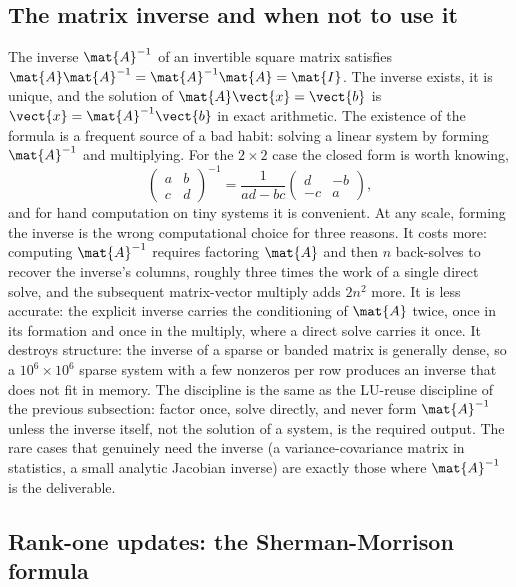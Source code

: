 

\subsection{The matrix inverse and when not to use it}

The inverse $\mat{A}^{-1}$ of an invertible square matrix satisfies
$\mat{A}\mat{A}^{-1} = \mat{A}^{-1}\mat{A} = \mat{I}$. The inverse
exists, it is unique, and the solution of $\mat{A}\vect{x} =
\vect{b}$ is $\vect{x} = \mat{A}^{-1}\vect{b}$ in exact arithmetic.
The existence of the formula is a frequent source of a bad habit:
solving a linear system by forming $\mat{A}^{-1}$ and multiplying.
For the $2 \times 2$ case the closed form is worth knowing,
\[
\begin{pmatrix} a & b \\ c & d \end{pmatrix}^{-1} = \frac{1}{ad - bc}
\begin{pmatrix} d & -b \\ -c & a \end{pmatrix},
\]
and for hand computation on tiny systems it is convenient. At any
scale, forming the inverse is the wrong computational choice for
three reasons. It costs more: computing $\mat{A}^{-1}$ requires
factoring $\mat{A}$ and then $n$ back-solves to recover the inverse's
columns, roughly three times the work of a single direct solve, and
the subsequent matrix-vector multiply adds $2n^{2}$ more. It is less
accurate: the explicit inverse carries the conditioning of $\mat{A}$
twice, once in its formation and once in the multiply, where a
direct solve carries it once. It destroys structure: the inverse of
a sparse or banded matrix is generally dense, so a $10^{6} \times
10^{6}$ sparse system with a few nonzeros per row produces an
inverse that does not fit in memory. The discipline is the same as
the LU-reuse discipline of the previous subsection: factor once,
solve directly, and never form $\mat{A}^{-1}$ unless the inverse
itself, not the solution of a system, is the required output. The
rare cases that genuinely need the inverse (a variance-covariance
matrix in statistics, a small analytic Jacobian inverse) are
exactly those where $\mat{A}^{-1}$ is the deliverable.

\subsection{Rank-one updates: the Sherman-Morrison formula}

